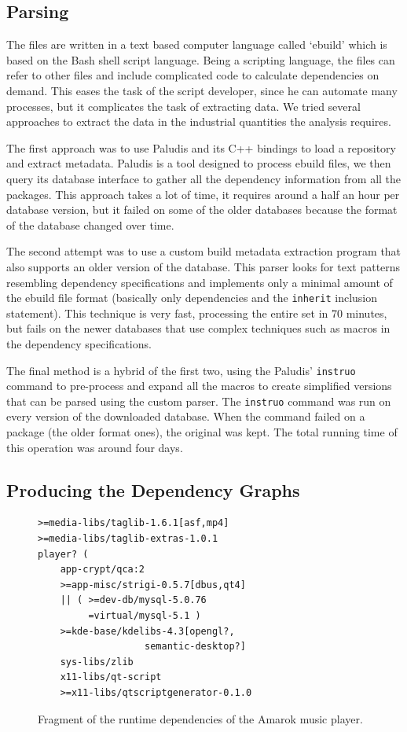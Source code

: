 \documentclass[smallextended,final]{svjour3}
\begin{document}
\subsection{Parsing}

The files are written in a text based computer language called `ebuild' which is based on the Bash shell script language. Being a scripting language, the files can refer to other files and include complicated code to calculate dependencies on demand. This eases the task of the script developer, since he can automate many processes, but it complicates the task of extracting data. We tried several approaches to extract the data in the industrial quantities the analysis requires.

The first approach was to use Paludis and its C++ bindings to load a repository and extract metadata. Paludis is a tool designed to process ebuild files, we then query its database interface to gather all the dependency information from all the packages. This approach takes a lot of time, it requires around a half an hour per database version, but it failed on some of the older databases because the format of the database changed over time.

The second attempt was to use a custom build metadata extraction program that also supports an older version of the database. This parser looks for text patterns resembling dependency specifications and implements only a minimal amount of the ebuild file format (basically only dependencies and the \verb|inherit| inclusion statement). This technique is very fast, processing the entire set in 70 minutes, but fails on the newer databases that use complex techniques such as macros in the dependency specifications.

The final method is a hybrid of the first two, using the Paludis' \verb|instruo| command to pre-process and expand all the macros to create simplified versions that can be parsed using the custom parser. The \verb|instruo| command was run on every version of the downloaded database. When the command failed on a package (the older format ones), the original was kept. The total running time of this operation was around four days.

\subsection{Producing the Dependency Graphs}

\begin{figure}
\small\centering
\begin{BVerbatim}
>=media-libs/taglib-1.6.1[asf,mp4]
>=media-libs/taglib-extras-1.0.1
player? (
    app-crypt/qca:2
    >=app-misc/strigi-0.5.7[dbus,qt4]
    || ( >=dev-db/mysql-5.0.76
         =virtual/mysql-5.1 )
    >=kde-base/kdelibs-4.3[opengl?,
                   semantic-desktop?]
    sys-libs/zlib
    x11-libs/qt-script
    >=x11-libs/qtscriptgenerator-0.1.0
\end{BVerbatim}
\caption{Fragment of the runtime dependencies of the Amarok music player.}\label{fig:amarokruntime}
\end{figure}
\end{document}
